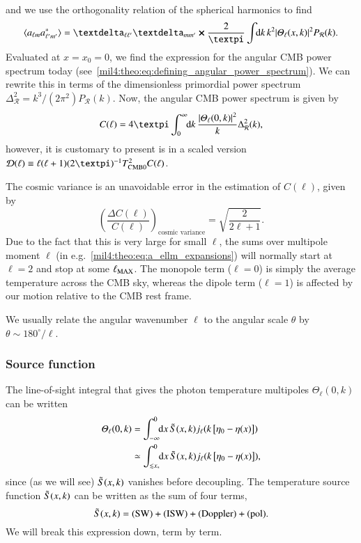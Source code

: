 and we use the orthogonality relation of the spherical harmonics to find
\begin{equation}
    \langle a\ellm a^*\ellmp \rangle = \deltasym{\ell \ell'} \deltasym{m m'} \cross \frac{2}{\pi}\int \dx{k} k^2  \abs{\Theta_{\ell}(x,k)}^2P_\mathcal{R}(k).
\end{equation}
Evaluated at $x=x_0=0$, we find the expression for the angular CMB power spectrum today (see~\cref{mil4:theo:eq:defining_angular_power_spectrum}). We can rewrite this in terms of the dimensionless primordial power spectrum $\Delta^2_\mathcal{R} = k^3/(2\pi^2) P_\mathcal{R}(k)$. Now, the angular CMB power spectrum is given by
\begin{equation}\label{mil4:theo:eq:C_of_ell_final}
    C(\ell) = 4\pi \int_0^{\infty} \dx{k} \frac{\abs{\Theta_\ell(0,k)}^2}{k} \Delta_\mathcal{R}^2(k),
\end{equation}
however, it is customary to present is in a scaled version $\mathcal{D}(\ell) \equiv \ell (\ell +1) (2\pi)^{-1} \TCMB^2 C(\ell)$.

The cosmic variance is an unavoidable error in the estimation of $C(\ell)$, given by 
\begin{equation}\label{mil4:theo:eq:cosmic_variance}
    \left( \frac{\Delta C(\ell)}{C(\ell)}\right)_\text{cosmic variance} = \sqrt{\frac{2}{2\ell +1}}.
\end{equation}
Due to the fact that this is very large for small $\ell$, the sums over multipole moment $\ell$ (in e.g.~\cref{mil4:theo:eq:a_ellm_expansions}) will normally start at $\ell=2$ and stop at some $\ell_\mathrm{MAX}$. The monopole term ($\ell=0$) is simply the average temperature across the CMB sky, whereas the dipole term ($\ell=1$) is affected by our motion relative to the CMB rest frame. 

We usually relate the angular wavenumber $\ell$ to the angular scale $\theta$ by $\theta \sim 180^{\circ} /\ell$. 


\subsubsection{Source function}
    The line-of-sight integral that gives the photon temperature multipoles $\Theta_\ell(0,k)$ can be written
    \begin{equation}\label{mil4:theo:eq:los_integration}
    \begin{split}
        \varTheta_\ell (0, k) &= \int_{-\infty}^{0} \!\!\mathop{}\!\mathrm{d} {x}\, \tilde{S}(x,k) j_\ell(k\left[\eta_0 -\eta(x)\right]) \\
        &\simeq  \int_{\lesssim x_*}^{0} \!\!\mathop{}\!\mathrm{d} {x}\, \tilde{S}(x,k) j_\ell(k\left[\eta_0 -\eta(x)\right]),
    \end{split}
    \end{equation}
    since (as we will see) $\tilde{S}(x,k)$ vanishes before decoupling. The temperature source function $\tilde{S}(x,k)$ can be written as the sum of four terms,
    \begin{equation}\label{mil4:theo:eq:source_function_four_terms}
        \tilde{S}(x,k) = \text{(SW)} + \text{(ISW)} + \text{(Doppler)} + \text{(pol)}.
    \end{equation}
    We will break this expression down, term by term. 

